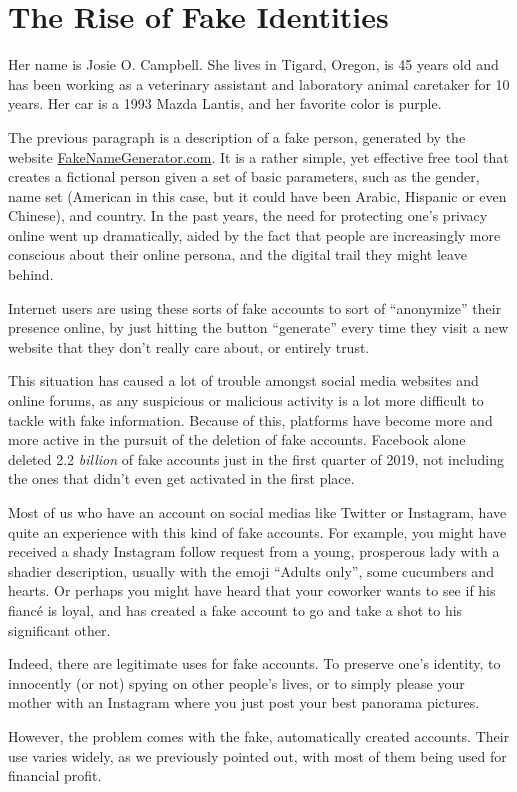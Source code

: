 \section{The Rise of Fake Identities}
\label{chap:rise_fake}

Her name is Josie O. Campbell. She lives in Tigard, Oregon, is 45 years old and has been working as a veterinary assistant and laboratory animal caretaker for 10 years. Her car is a 1993 Mazda Lantis, and her favorite color is purple.

The previous paragraph is a description of a fake person, generated by the website \href{https://fakenamegenerator.com}{FakeNameGenerator.com}. It is a rather simple, yet effective free tool that creates a fictional person given a set of basic parameters, such as the gender, name set (American in this case, but it could have been Arabic, Hispanic or even Chinese), and country. In the past years, the need for protecting one's privacy online went up dramatically, aided by the fact that people are increasingly more conscious about their online persona, and the digital trail they might leave behind.

Internet users are using these sorts of fake accounts to sort of ``anonymize'' their presence online, by just hitting the button ``generate'' every time they visit a new website that they don't really care about, or entirely trust.

This situation has caused a lot of trouble amongst social media websites and online forums, as any suspicious or malicious activity is a lot more difficult to tackle with fake information. Because of this, platforms have become more and more active in the pursuit of the deletion of fake accounts. Facebook alone deleted 2.2 \textit{billion} \cite{tankovska_2021} of fake accounts just in the first quarter of 2019, not including the ones that didn't even get activated in the first place.

Most of us who have an account on social medias like Twitter or Instagram, have quite an experience with this kind of fake accounts. For example, you might have received a shady Instagram follow request from a young, prosperous lady with a shadier description, usually with the emoji ``Adults only'', some cucumbers and hearts. Or perhaps you might have heard that your coworker wants to see if his fiancé is loyal, and has created a fake account to go and take a shot to his significant other.

Indeed, there are legitimate uses for fake accounts. To preserve one's identity, to innocently (or not) spying on other people's lives, or to simply please your mother with an Instagram where you just post your best panorama pictures.

However, the problem comes with the fake, automatically created accounts. Their use varies widely, as we previously pointed out, with most of them being used for financial profit.
